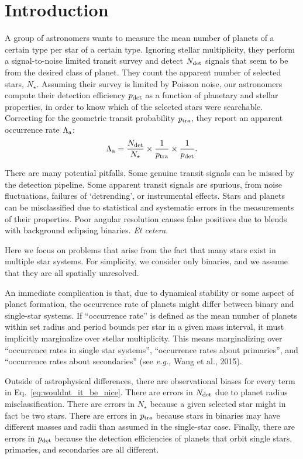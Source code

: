 \section{Introduction}

A group of astronomers wants to measure the mean number of planets of a 
certain type per star of a certain type.
Ignoring stellar multiplicity, they perform a signal-to-noise limited transit 
survey and detect $N_{\rm det}$ signals that seem to be from the desired 
class of planet.
They count the apparent number of selected stars, $N_\star$.
Assuming their survey is limited by Poisson noise, our astronomers compute 
their detection efficiency $p_{\rm det}$ as a function of planetary and 
stellar properties, in order to know which of the selected stars were
searchable.
Correcting for the geometric transit probability $p_{\rm tra}$, they report an 
apparent occurrence rate $\Lambda_{\rm a}$:
\begin{equation}
\Lambda_{\rm a} = \frac{N_{\rm det}}{N_\star} \times \frac{1}{p_{\rm tra}}
								  \times \frac{1}{p_{\rm det}}.
\label{eq:wouldnt_it_be_nice}
\end{equation}

There are many potential pitfalls.  Some genuine transit signals can be missed
by the detection pipeline.  Some apparent transit signals are spurious, from
noise fluctuations, failures of `detrending', or instrumental effects.  Stars
and planets can be misclassified due to statistical and systematic errors in
the measurements of their properties.  Poor angular resolution causes false
positives due to blends with background eclipsing binaries. {\it Et cetera}.

Here we focus on problems that arise from the fact that many stars exist in 
multiple star systems.
For simplicity, we consider only binaries, and we assume that they are all 
spatially unresolved.

An immediate complication is that, due to dynamical stability or some 
aspect of planet formation, the occurrence rate of planets might differ 
between binary and single-star systems.
If ``occurrence rate'' is defined as the mean number of planets within 
set radius and period bounds per star in a given mass interval, it must 
implicitly marginalize over stellar multiplicity.
This means marginalizing over ``occurrence rates in single star systems'', 
``occurrence rates about primaries'', and
``occurrence rates about secondaries'' (see {\it e.g.,} Wang et al., 
2015).

Outside of astrophysical differences, there are observational biases for every 
term in Eq.~\ref{eq:wouldnt_it_be_nice}.
There are errors in $N_{\rm det}$ due to planet radius misclassification.
There are errors in $N_\star$ because a given selected star might in fact be 
two stars.
There are errors in $p_{\rm tra}$ because stars in binaries may have different 
masses and radii than assumed in the single-star case.
Finally, there are errors in $p_{\rm det}$ because the detection efficiencies 
of planets that orbit single stars, primaries, and secondaries are all 
different.

